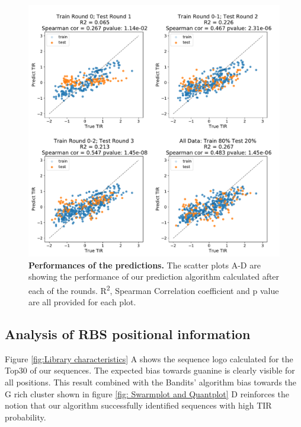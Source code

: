 \documentclass{article}
\begin{document}
\begin{figure}[h]
    \centering
    \includegraphics[scale=0.4]{plots/Main_Paper/scatter_abc1_FF.pdf}
    \caption{\textbf{Performances of the predictions.} The scatter plots A-D are showing the performance of our prediction algorithm calculated after each of the rounds. R\textsuperscript{2}, Spearman Correlation coefficient and p value are all provided for each plot.}
    \label{fig: Scatterplot}
\end{figure}

\subsection{Analysis of RBS positional information}

Figure \ref{fig:Library characteristics} A shows the sequence logo calculated for the Top30 of our sequences.
The expected bias towards guanine is clearly visible for all positions.
This result combined with the Bandits' algorithm bias towards the G rich cluster shown in figure \ref{fig: Swarmplot and Quantplot} D reinforces the notion that our algorithm successfully identified sequences with high TIR probability.\\
\end{document}
